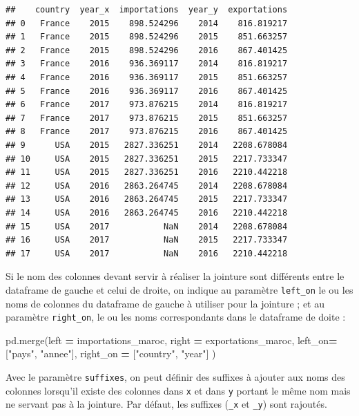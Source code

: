 \documentclass[12pt,]{book}
\newenvironment{Shaded}{\begin{snugshade}}{\end{snugshade}}
\newcommand{\StringTok}[1]{\textcolor[rgb]{0.31,0.60,0.02}{#1}}
\newcommand{\OperatorTok}[1]{\textcolor[rgb]{0.81,0.36,0.00}{\textbf{#1}}}
\newcommand{\NormalTok}[1]{#1}
\numberwithin{equation}{section}
\numberwithin{countremarque}{section}
\begin{document}
\begin{lstlisting}
##    country  year_x  importations  year_y  exportations
## 0   France    2015    898.524296    2014    816.819217
## 1   France    2015    898.524296    2015    851.663257
## 2   France    2015    898.524296    2016    867.401425
## 3   France    2016    936.369117    2014    816.819217
## 4   France    2016    936.369117    2015    851.663257
## 5   France    2016    936.369117    2016    867.401425
## 6   France    2017    973.876215    2014    816.819217
## 7   France    2017    973.876215    2015    851.663257
## 8   France    2017    973.876215    2016    867.401425
## 9      USA    2015   2827.336251    2014   2208.678084
## 10     USA    2015   2827.336251    2015   2217.733347
## 11     USA    2015   2827.336251    2016   2210.442218
## 12     USA    2016   2863.264745    2014   2208.678084
## 13     USA    2016   2863.264745    2015   2217.733347
## 14     USA    2016   2863.264745    2016   2210.442218
## 15     USA    2017           NaN    2014   2208.678084
## 16     USA    2017           NaN    2015   2217.733347
## 17     USA    2017           NaN    2016   2210.442218
\end{lstlisting}

Si le nom des colonnes devant servir à réaliser la jointure sont
différents entre le dataframe de gauche et celui de droite, on indique
au paramètre \texttt{left\_on} le ou les noms de colonnes du dataframe
de gauche à utiliser pour la jointure ; et au paramètre
\texttt{right\_on}, le ou les noms correspondants dans le dataframe de
doite :

\begin{Shaded}
\begin{Highlighting}[]
\NormalTok{pd.merge(left }\OperatorTok{=}\NormalTok{ importations_maroc, right }\OperatorTok{=}\NormalTok{ exportations_maroc,}
\NormalTok{         left_on}\OperatorTok{=}\NormalTok{ [}\StringTok{"pays"}\NormalTok{, }\StringTok{"annee"}\NormalTok{], right_on }\OperatorTok{=}\NormalTok{ [}\StringTok{"country"}\NormalTok{, }\StringTok{"year"}\NormalTok{] )}
\end{Highlighting}
\end{Shaded}

Avec le paramètre \texttt{suffixes}, on peut définir des suffixes à
ajouter aux noms des colonnes lorsqu'il existe des colonnes dans
\texttt{x} et dans \texttt{y} portant le même nom mais ne servant pas à
la jointure. Par défaut, les suffixes (\texttt{\_x} et \texttt{\_y})
sont rajoutés.
\end{document}
